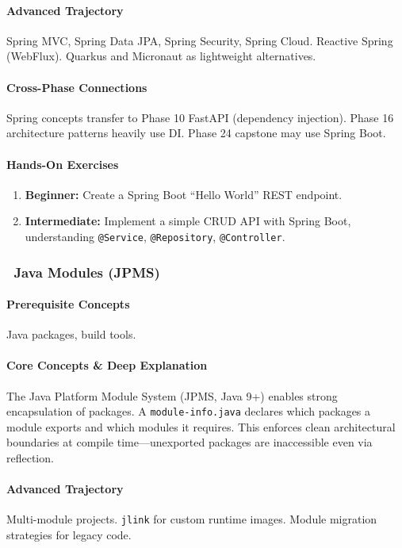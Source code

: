 \documentclass[11pt, a4paper, oneside]{report}
\newcommand{\awareness}[1]{\subsubsection{\texorpdfstring{\fcolorbox{gray!50}{gray!10}{\footnotesize\bfseries\color{gray!50!black} AWARENESS}~#1}{#1}}}
\begin{document}
\paragraph{Advanced Trajectory} Spring MVC, Spring Data JPA, Spring Security, Spring Cloud. Reactive Spring (WebFlux). Quarkus and Micronaut as lightweight alternatives.

\paragraph{Cross-Phase Connections} Spring concepts transfer to Phase 10 FastAPI (dependency injection). Phase 16 architecture patterns heavily use DI. Phase 24 capstone may use Spring Boot.

\paragraph{Hands-On Exercises}
\begin{enumerate}[leftmargin=*]
\item \textbf{Beginner:} Create a Spring Boot ``Hello World'' REST endpoint.
\item \textbf{Intermediate:} Implement a simple CRUD API with Spring Boot, understanding \texttt{@Service}, \texttt{@Repository}, \texttt{@Controller}.
\end{enumerate}

\awareness{Java Modules (JPMS)}

\paragraph{Prerequisite Concepts} Java packages, build tools.

\paragraph{Core Concepts \& Deep Explanation} The Java Platform Module System (JPMS, Java 9+) enables strong encapsulation of packages. A \texttt{module-info.java} declares which packages a module exports and which modules it requires. This enforces clean architectural boundaries at compile time---unexported packages are inaccessible even via reflection.

\paragraph{Advanced Trajectory} Multi-module projects. \texttt{jlink} for custom runtime images. Module migration strategies for legacy code.
\end{document}

